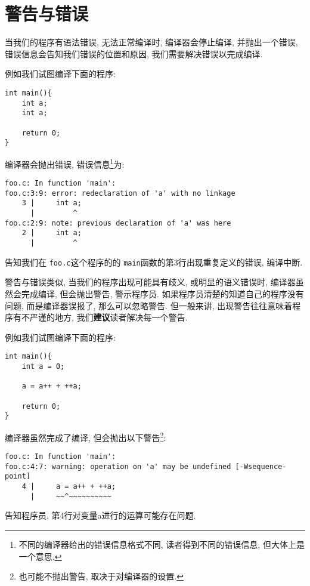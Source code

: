     \section{警告与错误} \label{警告与错误}
        当我们的程序有语法错误, 无法正常编译时, 编译器会停止编译, 并抛出一个错误, 错误信息会告知我们错误的位置和原因, 我们需要解决错误以完成编译.

        例如我们试图编译下面的程序:
\begin{lstlisting}
int main(){
    int a;
    int a;

    return 0;
}
\end{lstlisting}
        编译器会抛出错误, 错误信息\footnote{不同的编译器给出的错误信息格式不同, 读者得到不同的错误信息, 但大体上是一个意思.}为:
\begin{lstlisting}
foo.c: In function 'main':
foo.c:3:9: error: redeclaration of 'a' with no linkage
    3 |     int a;
      |         ^
foo.c:2:9: note: previous declaration of 'a' was here
    2 |     int a;
      |         ^
\end{lstlisting}
        告知我们在 \texttt{foo.c}这个程序的的 \texttt{main}函数的第3行出现重复定义的错误, 编译中断.

        警告与错误类似, 当我们的程序出现可能具有歧义, 或明显的语义错误时, 编译器虽然会完成编译, 但会抛出警告, 警示程序员. 如果程序员清楚的知道自己的程序没有问题, 而是编译器误报了, 那么可以忽略警告. 但一般来讲, 出现警告往往意味着程序有不严谨的地方, 我们\textbf{建议}读者解决每一个警告.

        例如我们试图编译下面的程序:
\begin{lstlisting}
int main(){
    int a = 0;

    a = a++ + ++a;

    return 0;
}
\end{lstlisting}
        编译器虽然完成了编译, 但会抛出以下警告\footnote{也可能不抛出警告, 取决于对编译器的设置.}:
\begin{lstlisting}
foo.c: In function 'main':
foo.c:4:7: warning: operation on 'a' may be undefined [-Wsequence-point]
    4 |     a = a++ + ++a;
      |     ~~^~~~~~~~~~~
\end{lstlisting}
        告知程序员, 第4行对变量a进行的运算可能存在问题.


